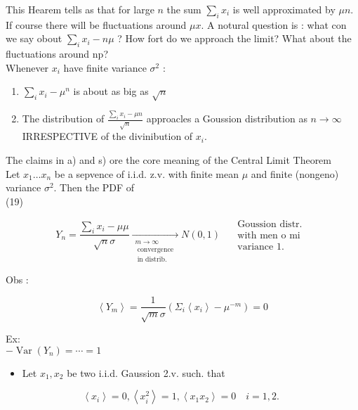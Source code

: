 \documentclass[10pt]{article}
\begin{document}
This Hearem tells as that for large $n$ the sum $\sum_{i} x_{i}$ is well approximated by $\mu n$. If course there will be fluctuations around $\mu x$. A notural question is : what con we say obout $\sum_{i} x_{i}-n \mu$ ? How fort do we approach the limit? What about the fluctuations around np?\\
Whenever $x_{i}$ have finite variance $\sigma^{2}$ :

\begin{enumerate}
  \item $\sum_{i} x_{i}-\mu^{n}$ is about as big as $\sqrt{n}$
  \item The distribution of $\frac{\sum_{i} x_{i}-\mu n}{\sqrt{n}}$ approacles a Goussion distribution as $n \rightarrow \infty$ IRRESPECTIVE of the divinibution of $x_{i}$.
\end{enumerate}

The claims in a) and s) ore the core meaning of the Central Limit Theorem\\
Let $x_{1} \ldots x_{n}$ be a sepvence of i.i.d. z.v. with finite mean $\mu$ and finite (nongeno) variance $\sigma^{2}$. Then the PDF of\\
(19)

$$
Y_{n}=\frac{\sum_{i} x_{i}-\mu \mu}{\sqrt{n} \sigma} \xrightarrow[\begin{array}{c}
m \rightarrow \infty \\
\text { convergence } \\
\text { in distrib. }
\end{array}]{ } N(0,1) \quad \begin{gathered}
\text { Goussion distr. } \\
\text { with men o mi } \\
\text { variance } 1 .
\end{gathered}
$$

Obs :

$$
\left\langle Y_{m}\right\rangle=\frac{1}{\sqrt{m} \sigma}\left(\Sigma_{i}\left\langle x_{i}\right\rangle-\mu^{-m}\right)=0
$$

Ex:\\
$-\operatorname{Var}\left(Y_{n}\right)=\cdots=1$

\begin{itemize}
  \item Let $x_{1}, x_{2}$ be two i.i.d. Gaussion 2.v. such. that
\end{itemize}

$$
\left\langle x_{i}\right\rangle=0,\left\langle x_{i}^{2}\right\rangle=1,\left\langle x_{1} x_{2}\right\rangle=0 \quad i=1,2 \text {. }
$$
\end{document}
